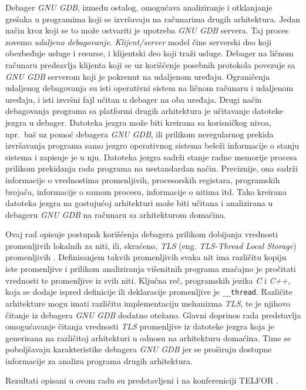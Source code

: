 \documentclass[12pt,oneside]{memoir}
\begin{document}
Debager \emph{GNU GDB}, između ostalog, omogućava analiziranje i otklanjanje grešaka u programima koji se izvršavaju na računarima drugih arhitektura. Jedan način kroz koji se to može ostvariti je upotreba \emph{GNU GDB} servera. Taj proces zovemo \emph{udaljeno debagovanje}. \emph{Klijent/server} model čine serverski deo koji obezbeđuje usluge i resurse, i klijentski deo koji traži usluge. Debager na ličnom računaru predsavlja klijenta koji se uz korišćenje posebnih protokola povezuje sa \emph{GNU GDB} serverom koji je pokrenut na udaljenom uređaju. Ograničenja udaljenog debagovanja su isti operativni sistem na ličnom računaru i udaljenom uređaju, i isti izvršni fajl učitan u debager na oba uređaja. Drugi način debagovanja programa sa platformi drugih arhitektura je učitavanje datoteke jezgra u debager. Datoteka jezgra može biti kreirana sa korisničkog nivoa, npr.~baš uz pomoć debagera \emph{GNU GDB}, ili prilikom neregularnog prekida izvršavanja programa samo jezgro operativnog sistema beleži informacije o stanju sistema i zapisuje je u nju. Datoteka jezgra sadrži stanje radne memorije procesa prilikom prekidanja rada programa na nestandardan način. Preciznije, ona sadrži informacije o vrednostima promenljivih, procesorskih registara, programskih brojača, informacije o samom procesu, informacije o nitima itd. Tako kreirana datoteka jezgra na gostujućoj arhitekturi može biti učitana i analizirana u debageru \emph{GNU GDB} na računaru sa arhitekturom domaćina.

Ovaj rad opisuje postupak korišćenja debagera prilikom dobijanja vrednosti promenljivih lokalnih za niti, ili, skraćeno, \emph{TLS} (eng. \emph{TLS-Thread Local Storage}) promenljivih \cite{TLS}. Definisanjem takvih promenljivih svaka nit ima različitu kopiju iste promenljive i prilikom analiziranja višenitnih programa značajno je pročitati vrednosti te promenljive iz svih niti. Ključna reč, programskih jezika \emph{C} i \emph{C++}, koja se dodaje ispred definicije ili deklaracije promenljive je \texttt{\_\_thread}. Različite arhitekture mogu imati različitu implementaciju mehanizma \emph{TLS}, te je njihovo čitanje iz debagera \emph{GNU GDB} dodatno otežano.
Glavni doprinos rada predstavlja omogućavanje čitanja vrednosti \emph{TLS} promenljive iz datoteke jezgra koja je generisana na različitoj arhitekturi u odnosu na arhitekturu domaćina. Time se poboljšavaju karakteristike debagera \emph{GNU GDB} jer se proširuju dostupne informacije za analizu programa drugih arhitektura.

Rezultati opisani u ovom radu su predstavljeni i na konfereniciji TELFOR \cite{TELFOR}.
\end{document}
